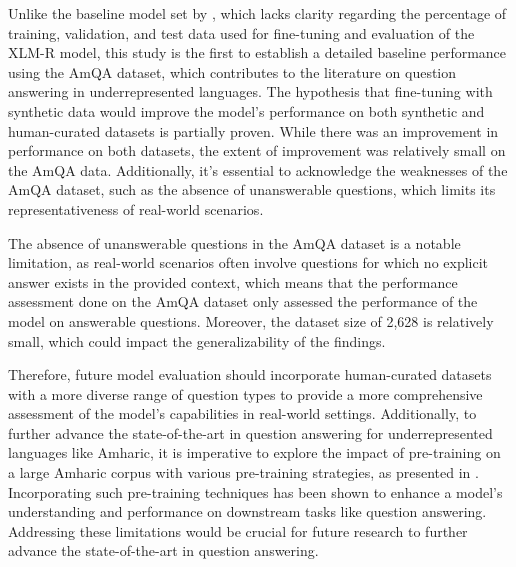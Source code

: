 Unlike the baseline model set by \cite{abedissa2019amharic}, which lacks clarity regarding the percentage of training, validation, and test data used for fine-tuning and evaluation of the XLM-R model, this study is the first to establish a detailed baseline performance using the AmQA dataset, which contributes to the literature on question answering in underrepresented languages. The hypothesis that fine-tuning with synthetic data would improve the model's performance on both synthetic and human-curated datasets is partially proven. While there was an improvement in performance on both datasets, the extent of improvement was relatively small on the AmQA data. Additionally, it's essential to acknowledge the weaknesses of the AmQA dataset, such as the absence of unanswerable questions, which limits its representativeness of real-world scenarios.

The absence of unanswerable questions in the AmQA dataset is a notable limitation, as real-world scenarios often involve questions for which no explicit answer exists in the provided context, which means that the performance assessment done on the AmQA dataset only assessed the performance of the model on answerable questions. Moreover, the dataset size of 2,628 is relatively small, which could impact the generalizability of the findings. 

Therefore, future model evaluation should incorporate human-curated datasets with a more diverse range of question types to provide a more comprehensive assessment of the model's capabilities in real-world settings. Additionally, to further advance the state-of-the-art in question answering for underrepresented languages like Amharic, it is imperative to explore the impact of pre-training on a large Amharic corpus with various pre-training strategies, as presented in \cite{liu2019roberta}. Incorporating such pre-training techniques has been shown to enhance a model's understanding and performance on downstream tasks like question answering. Addressing these limitations would be crucial for future research to further advance the state-of-the-art in question answering.
